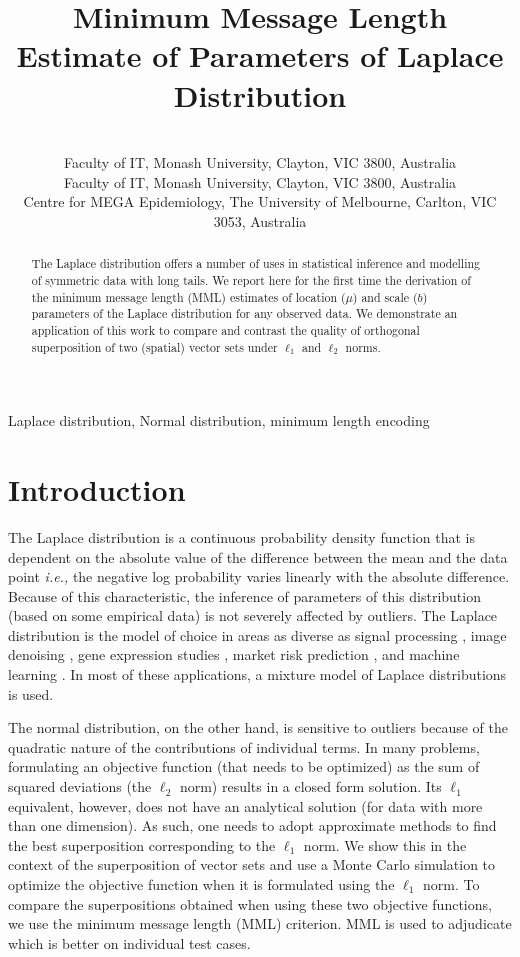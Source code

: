 \documentclass[wcp]{jmlr}
\title[MML Laplace]{Minimum Message Length Estimate of Parameters of Laplace Distribution}
\author{\Name{Parthan Kasarapu} \Email{parthan.kasarapu@monash.edu}\\
  \addr Faculty of IT, Monash University, Clayton, VIC 3800, Australia
  \AND
  \Name{Lloyd Allison} \Email{lloyd.allison@monash.edu}\\
  \addr Faculty of IT, Monash University, Clayton, VIC 3800, Australia
  \AND
  \Name{Enes Makalic} \Email{emakalic@unimelb.edu.au}\\
  \addr Centre for MEGA Epidemiology, The University of Melbourne, Carlton, VIC 3053, Australia
 }
\begin{document}
\maketitle

\begin{abstract}
The Laplace distribution offers a number of uses in statistical inference and
modelling of symmetric data with long tails. We report here for the first time
the derivation of the minimum message length (MML) estimates of location ($\mu$) and 
scale ($b$) parameters of the Laplace distribution for any observed data. 
We demonstrate an application of this work to compare and contrast the
quality of orthogonal superposition of two (spatial) vector sets under 
$\ell_1$ and $\ell_2$ norms.
\end{abstract}

\begin{keywords}
Laplace distribution, Normal distribution, minimum length encoding 
\end{keywords}

\section{Introduction}
The Laplace distribution is a continuous probability density function that is dependent on
the absolute value of the difference between the mean and the data point \textit{i.e.,}
the negative log probability varies linearly with the absolute difference. Because of
this characteristic, the inference of parameters of this distribution (based on some 
empirical data) is not severely affected by outliers. The Laplace distribution
is the model of choice in areas as diverse as signal processing 
\citep{laplace-signal-processing}, image denoising \citep{image-denoising},
gene expression studies \citep{Bhowmick01102006}, market risk prediction
\citep{haas2005modeling}, and machine learning \citep{Cord:2006:FSR:1167556.1167570}.
In most of these applications, a mixture model of Laplace distributions is used. 

The normal distribution, on the other hand, is sensitive to outliers because of the quadratic 
nature of the contributions of individual terms. 
In many problems, formulating an objective function (that needs 
to be optimized) as the sum of squared deviations (the $\ell_2$ norm) results in a closed
form solution. Its $\ell_1$ equivalent, however, does not have an analytical solution
(for data with more than one dimension). As such, one needs to adopt approximate 
methods to find the best superposition corresponding to the $\ell_1$ norm. 
We show this in the context of the superposition of vector sets and use a Monte Carlo simulation
to optimize the objective function when it is formulated using the $\ell_1$ norm. To compare
the superpositions obtained when using these two objective functions, we use
the minimum message length (MML) criterion. MML is used to adjudicate which is 
better on individual test cases. 
\end{document}
